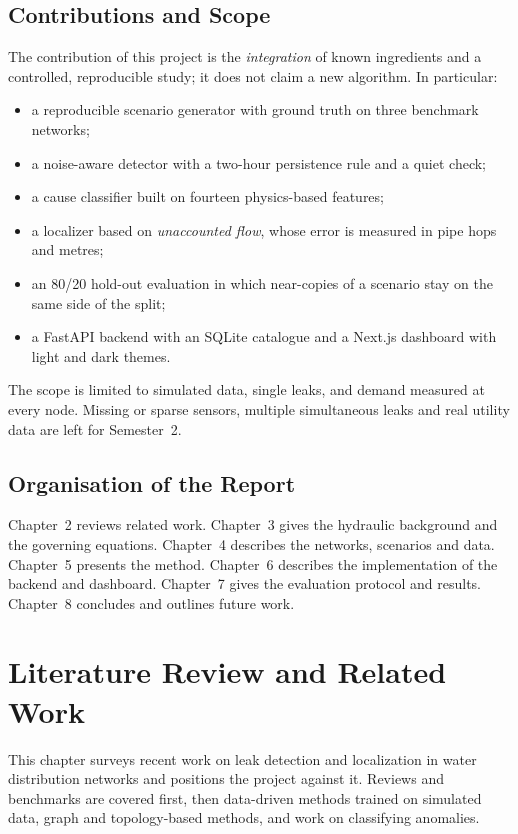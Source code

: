 \documentclass[11pt,letterpaper]{report}
\theoremstyle{definition}
\theoremstyle{plain}
\theoremstyle{remark}
\begin{document}
\section{Contributions and Scope}
The contribution of this project is the \emph{integration} of known ingredients and a controlled, reproducible study; it does not claim a new algorithm. In particular:
\begin{itemize}
\item a reproducible scenario generator with ground truth on three benchmark networks;
\item a noise-aware detector with a two-hour persistence rule and a quiet check;
\item a cause classifier built on fourteen physics-based features;
\item a localizer based on \emph{unaccounted flow}, whose error is measured in pipe hops and metres;
\item an 80/20 hold-out evaluation in which near-copies of a scenario stay on the same side of the split;
\item a FastAPI backend with an SQLite catalogue and a Next.js dashboard with light and dark themes.
\end{itemize}
The scope is limited to simulated data, single leaks, and demand measured at every node. Missing or sparse sensors, multiple simultaneous leaks and real utility data are left for Semester~2.

\section{Organisation of the Report}
Chapter~2 reviews related work. Chapter~3 gives the hydraulic background and the governing equations. Chapter~4 describes the networks, scenarios and data. Chapter~5 presents the method. Chapter~6 describes the implementation of the backend and dashboard. Chapter~7 gives the evaluation protocol and results. Chapter~8 concludes and outlines future work.

\chapter{Literature Review and Related Work}
This chapter surveys recent work on leak detection and localization in water distribution networks and positions the project against it. Reviews and benchmarks are covered first, then data-driven methods trained on simulated data, graph and topology-based methods, and work on classifying anomalies.
\end{document}
